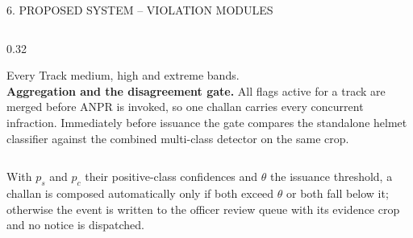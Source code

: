 \documentclass[aspectratio=169,10pt,t]{beamer}
\begin{document}
\begin{frame}{6. PROPOSED SYSTEM -- VIOLATION MODULES}
\begin{columns}[T,onlytextwidth]
\begin{column}{0.32\textwidth}
\begin{block}{Every Track}
medium, high and extreme bands.\\[0.4em]
\textbf{Aggregation and the disagreement gate.} All flags active for a track are merged before ANPR is invoked, so one
challan carries every concurrent infraction. Immediately before issuance the gate compares the standalone helmet
classifier against the combined multi-class detector on the same crop.
\end{block}
\end{column}
\end{columns}
\vspace{0.4em}
With $p_s$ and $p_c$ their positive-class confidences and $\theta$ the issuance threshold, a challan is composed
automatically only if both exceed $\theta$ or both fall below it; otherwise the event is written to the officer review
queue with its evidence crop and no notice is dispatched.
\end{frame}
\end{document}
